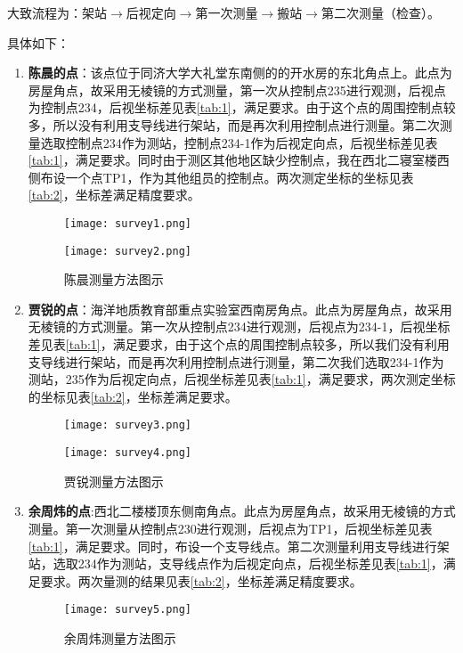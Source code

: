 大致流程为：架站$\rightarrow$后视定向$\rightarrow$第一次测量$\rightarrow$搬站$\rightarrow$第二次测量（检查）。

具体如下：
\begin{enumerate}
\item \textbf{陈晨的点}：该点位于同济大学大礼堂东南侧的的开水房的东北角点上。此点为房屋角点，故采用无棱镜的方式测量，第一次从控制点235进行观测，后视点为控制点234，后视坐标差见表\ref{tab:1}，满足要求。由于这个点的周围控制点较多，所以没有利用支导线进行架站，而是再次利用控制点进行测量。第二次测量选取控制点234作为测站，控制点234-1作为后视定向点，后视坐标差见表\ref{tab:1}，满足要求。同时由于测区其他地区缺少控制点，我在西北二寝室楼西侧布设一个点TP1，作为其他组员的控制点。两次测定坐标的坐标见表\ref{tab:2}，坐标差满足精度要求。

\begin{figure}[htbp]
\begin{minipage}[c]{0.5\textwidth}
\centering
\texttt{[image: survey1.png]}
\end{minipage}%
\begin{minipage}[c]{0.5\textwidth}
\centering
\texttt{[image: survey2.png]}
\end{minipage}
\caption{陈晨测量方法图示}
\end{figure}

\item\textbf{贾锐的点}：海洋地质教育部重点实验室西南房角点。此点为房屋角点，故采用无棱镜的方式测量。第一次从控制点234进行观测，后视点为234-1，后视坐标差见表\ref{tab:1}，满足要求，由于这个点的周围控制点较多，所以我们没有利用支导线进行架站，而是再次利用控制点进行测量，第二次我们选取234-1作为测站，235作为后视定向点，后视坐标差见表\ref{tab:1}，满足要求，两次测定坐标的坐标见表\ref{tab:2}，坐标差满足要求。

\begin{figure}[htbp]
\begin{minipage}[c]{0.5\textwidth}
\centering
\texttt{[image: survey3.png]}
\end{minipage}%
\begin{minipage}[c]{0.5\textwidth}
\centering
\texttt{[image: survey4.png]}
\end{minipage}
\caption{贾锐测量方法图示}
\end{figure}

\item\textbf{余周炜的点}:西北二楼楼顶东侧南角点。此点为房屋角点，故采用无棱镜的方式测量。第一次测量从控制点230进行观测，后视点为TP1，后视坐标差见表\ref{tab:1}，满足要求。同时，布设一个支导线点。第二次测量利用支导线进行架站，选取234作为测站，支导线点作为后视定向点，后视坐标差见表\ref{tab:1}，满足要求。两次量测的结果见表\ref{tab:2}，坐标差满足精度要求。
\begin{figure}[htbp]
\centering
\texttt{[image: survey5.png]}
\caption{余周炜测量方法图示}
\end{figure}


\end{enumerate}
